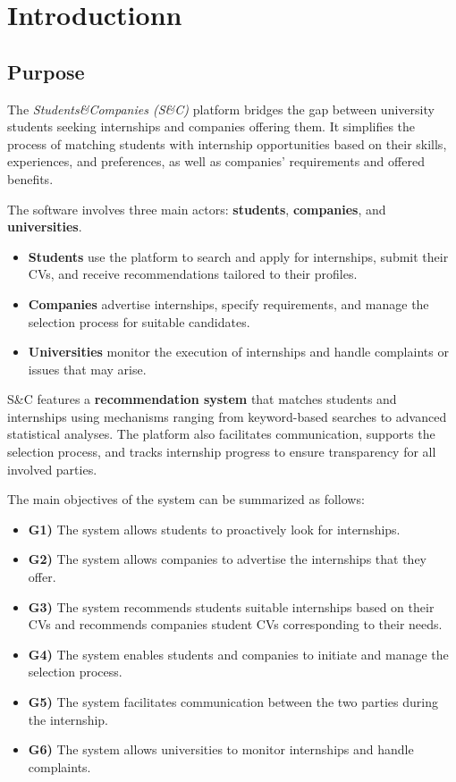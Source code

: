 \chapter{Introductionn}

\section{Purpose}

The \textit{Students\&Companies (S\&C)} platform bridges the gap between university students seeking internships and companies offering them. It simplifies the process of matching students with internship opportunities based on their skills, experiences, and preferences, as well as companies' requirements and offered benefits.

The software involves three main actors: \textbf{students}, \textbf{companies}, and \textbf{universities}.

\begin{itemize}
    \item \textbf{Students} use the platform to search and apply for internships, submit their CVs, and receive recommendations tailored to their profiles.
    \item \textbf{Companies} advertise internships, specify requirements, and manage the selection process for suitable candidates.
    \item \textbf{Universities} monitor the execution of internships and handle complaints or issues that may arise.
\end{itemize}

S\&C features a \textbf{recommendation system} that matches students and internships using mechanisms ranging from keyword-based searches to advanced statistical analyses. The platform also facilitates communication, supports the selection process, and tracks internship progress to ensure transparency for all involved parties.

The main objectives of the system can be summarized as follows:

\begin{itemize}
    \item \textbf{G1)} The system allows students to proactively look for internships.
    \item \textbf{G2)} The system allows companies to advertise the internships that they offer.
    \item \textbf{G3)} The system recommends students suitable internships based on their CVs and recommends companies student CVs corresponding to their needs.
    \item \textbf{G4)} The system enables students and companies to initiate and manage the selection process.
    \item \textbf{G5)} The system facilitates communication between the two parties during the internship.
    \item \textbf{G6)} The system allows universities to monitor internships and handle complaints.
\end{itemize}

